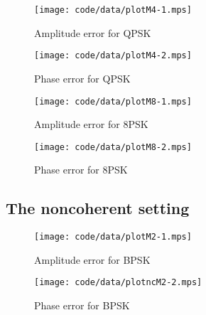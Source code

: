 \documentclass[a4paper,10pt]{article}
\begin{document}
\begin{figure*}[tp]
	\centering
		\texttt{[image: code/data/plotM4-1.mps]}
		\caption{Amplitude error for QPSK}
		\label{fig:plotamp}
\end{figure*}


\begin{figure*}[tp]
	\centering
		\texttt{[image: code/data/plotM4-2.mps]}
		\caption{Phase error for QPSK}
		\label{fig:plotphase}
\end{figure*}


\begin{figure*}[tp]
	\centering
		\texttt{[image: code/data/plotM8-1.mps]}
		\caption{Amplitude error for 8PSK}
		\label{fig:plotamp}
\end{figure*}


\begin{figure*}[tp]
	\centering
		\texttt{[image: code/data/plotM8-2.mps]}
		\caption{Phase error for 8PSK}
		\label{fig:plotphase}
\end{figure*}


\subsection{The noncoherent setting}

 \begin{figure*}[tp]
 	\centering
 		\texttt{[image: code/data/plotM2-1.mps]}
 		\caption{Amplitude error for BPSK}
 		\label{fig:plotamp}
 \end{figure*}


\begin{figure*}[tp]
	\centering
		\texttt{[image: code/data/plotncM2-2.mps]}
		\caption{Phase error for BPSK}
		\label{fig:plotphase}
\end{figure*}

\end{document}
